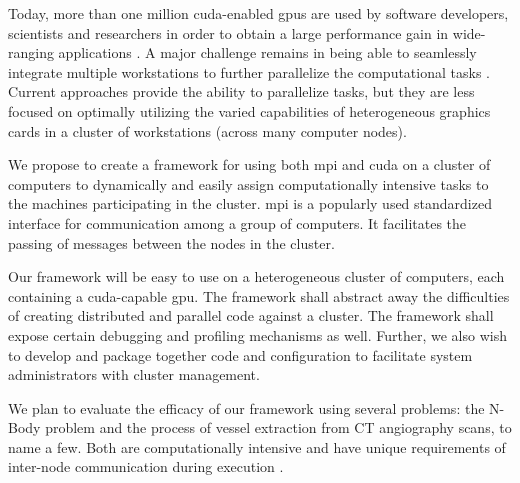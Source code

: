 Today, more than one million \gls{cuda}-enabled \glspl{gpu} are used by
software developers, scientists and researchers in order to obtain a large
performance gain in wide-ranging applications
\cite{website:cudaCProgrammingGuide}. A major challenge remains in being
able to seamlessly integrate multiple workstations to further parallelize the
computational tasks \cite{hadri2010identifying} \cite{hindman2009common}.
Current approaches provide the ability to parallelize tasks, but they are less
focused on optimally utilizing the varied capabilities of heterogeneous
graphics cards in a cluster of workstations (across many computer nodes).

We propose to create a framework for using both \Gls{mpi} and \gls{cuda} on a
cluster of computers to dynamically and easily assign computationally intensive
tasks to the machines participating in the cluster. \Gls{mpi} is a popularly
used standardized interface for communication among a group of computers. It
facilitates the passing of messages between the nodes in the cluster.

Our framework will be easy to use on a heterogeneous cluster of computers, each
containing a \Gls{cuda}-capable \gls{gpu}\@. The framework shall abstract away
the difficulties of creating distributed and parallel code against a
\gls{cluster}. The framework shall expose certain debugging and profiling
mechanisms as well. Further, we also wish to develop and package together code
and configuration to facilitate system administrators with \gls{cluster}
management.

We plan to evaluate the efficacy of our framework using several problems: the
N-Body problem and the process of vessel extraction from CT angiography scans,
to name a few. Both are computationally intensive and have unique requirements
of inter-node communication during execution \cite{erdt2008automatic}.
